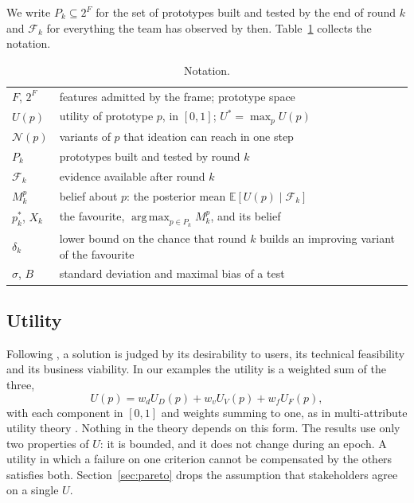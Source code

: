 \documentclass[10pt,twocolumn]{article}
\DeclareMathOperator*{\argmax}{arg\,max}
\newcommand{\E}{\mathbb{E}}
\newcommand{\filt}{\mathcal{F}}
\newcommand{\Nb}{\mathcal{N}}
\newcommand{\Pk}{P_k}
\theoremstyle{definition}
\begin{document}
We write $\Pk\subseteq 2^F$ for the set of prototypes built and tested by the end of round $k$ and $\filt_k$ for everything the team has observed by then. Table~\ref{tab:notation} collects the notation.

\begin{table}[t]
\caption{Notation.}
\label{tab:notation}
\small
\begin{tabularx}{\columnwidth}{@{}lX@{}}
\toprule
$F$, $2^F$ & features admitted by the frame; prototype space\\
$U(p)$ & utility of prototype $p$, in $[0,1]$; $U^*=\max_p U(p)$\\
$\Nb(p)$ & variants of $p$ that ideation can reach in one step\\
$\Pk$ & prototypes built and tested by round $k$\\
$\filt_k$ & evidence available after round $k$\\
$M^p_k$ & belief about $p$: the posterior mean $\E[U(p)\mid\filt_k]$\\
$p^*_k$, $X_k$ & the favourite, $\argmax_{p\in \Pk}M^p_k$, and its belief\\
$\delta_k$ & lower bound on the chance that round $k$ builds an improving variant of the favourite\\
$\sigma$, $B$ & standard deviation and maximal bias of a test\\
\bottomrule
\end{tabularx}
\end{table}

\subsection{Utility}

Following \citet{brown2009}, a solution is judged by its desirability to users, its technical feasibility and its business viability. In our examples the utility is a weighted sum of the three,
\begin{equation}
\label{eq:utility}
U(p)=w_dU_D(p)+w_vU_V(p)+w_fU_F(p),
\end{equation}
with each component in $[0,1]$ and weights summing to one, as in multi-attribute utility theory \citep{keeney1976}. Nothing in the theory depends on this form. The results use only two properties of $U$: it is bounded, and it does not change during an epoch. A utility in which a failure on one criterion cannot be compensated by the others satisfies both. Section~\ref{sec:pareto} drops the assumption that stakeholders agree on a single $U$.
\end{document}
